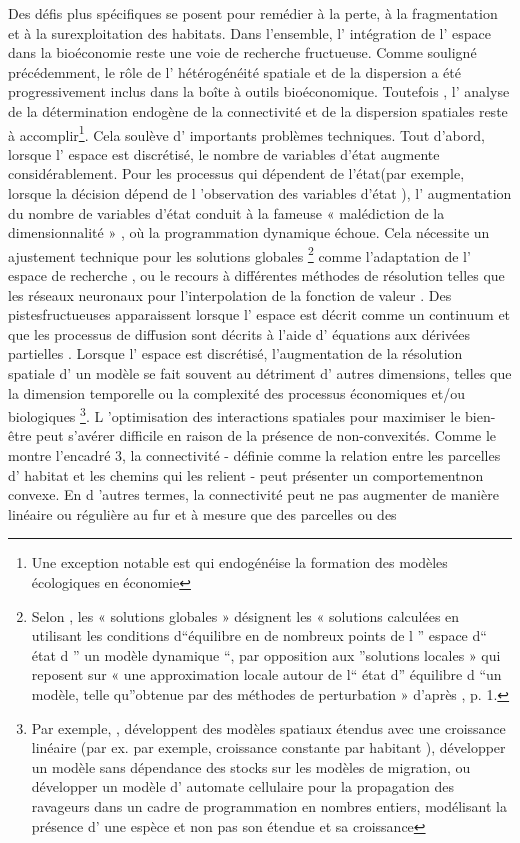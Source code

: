 \begin{displayquote}
\begin{displayquote}
\begin{displayquote}
{{{  Des défis plus spécifiques se posent pour remédier à la perte, à la fragmentation et à la surexploitation des habitats. Dans l'ensemble, l' intégration de l' espace dans la bioéconomie reste une voie de recherche fructueuse. Comme souligné précédemment, le rôle de l' hétérogénéité spatiale et de la dispersion a été progressivement inclus dans la boîte à outils bioéconomique. Toutefois , l' analyse de la détermination endogène de la connectivité et de la dispersion spatiales reste à accomplir\footnote{Une exception notable est \cite{brock_pattern_2010} qui endogénéise la formation des modèles écologiques en économie}. Cela soulève d' importants problèmes techniques. Tout d'abord, lorsque l' espace est discrétisé, le nombre de variables d'état augmente considérablement. Pour les processus qui dépendent de l'état(par exemple, lorsque la décision dépend de l 'observation des variables d'état ), l' augmentation du nombre de variables d'état conduit à la fameuse « malédiction de la dimensionnalité » \citep{Bellman}, où la programmation dynamique échoue. Cela nécessite un ajustement technique pour les solutions globales \footnote{Selon \cite{brumm_adaptive_2017}, les « solutions globales » désignent les « solutions calculées en utilisant les conditions d“équilibre en de nombreux points de l ” espace d“ état d ” un modèle dynamique “, par opposition aux ”solutions locales » qui reposent sur « une approximation locale autour de l“ état d” équilibre d “un modèle, telle qu”obtenue par des méthodes de perturbation » d'après \cite{friedl_deep_2023}, p. 1. } comme l'adaptation de l' espace de recherche \citep{brumm_adaptive_2017}, ou le recours à différentes méthodes de résolution telles que les réseaux neuronaux pour l'interpolation de la fonction de valeur \citep{friedl_deep_2023}. Des pistesfructueuses apparaissent lorsque l' espace est décrit comme un continuum et que les processus de diffusion sont décrits à l'aide d' équations aux dérivées partielles \citep{brock_pattern_2010, brock_2020}. Lorsque l' espace est discrétisé, l'augmentation de la résolution spatiale d' un modèle se fait souvent au détriment d' autres dimensions, telles que la dimension temporelle ou la complexité des processus économiques et/ou biologiques \footnote{Par exemple, \cite{blackwood_cost-effective_2010}, \cite{fabbri_competition_2022} développent des modèles spatiaux étendus avec une croissance linéaire (par ex.   par exemple, croissance constante par habitant ), \cite{costello_optimal_2008} développer un modèle sans dépendance des stocks sur les modèles de migration, ou \cite{Wilen2012} développer un modèle d' automate cellulaire pour la propagation des ravageurs dans un cadre de programmation en nombres entiers, modélisant la présence d' une espèce et non pas son étendue et sa croissance}. L 'optimisation des interactions spatiales pour maximiser le bien-être peut s'avérer difficile en raison de la présence de non-convexités. Comme le montre l'encadré 3, la connectivité - définie comme la relation entre les parcelles d' habitat et les chemins qui les relient - peut présenter un comportementnon convexe. En d 'autres termes, la connectivité peut ne pas augmenter de manière linéaire ou régulière au fur et à mesure que des parcelles ou des }}}
\end{displayquote}
\end{displayquote}
\end{displayquote}
